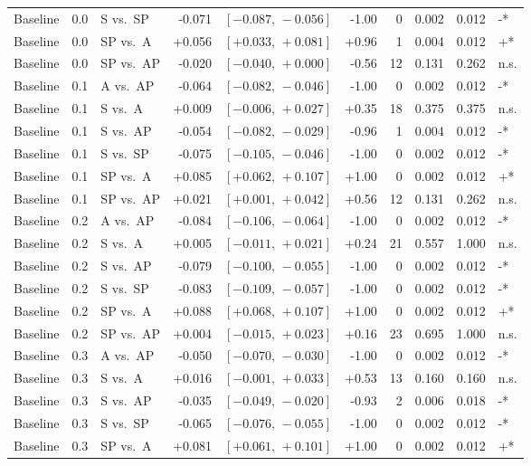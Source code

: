\begin{landscape}
\begin{scriptsize}
\begin{longtable}{lllrrrrrrl}
Baseline & 0.0 & S vs.\ SP & -0.071 & $[-0.087,\,-0.056]$ & -1.00 & 0 & 0.002 & 0.012 & -* \\
Baseline & 0.0 & SP vs.\ A & +0.056 & $[+0.033,\,+0.081]$ & +0.96 & 1 & 0.004 & 0.012 & +* \\
Baseline & 0.0 & SP vs.\ AP & -0.020 & $[-0.040,\,+0.000]$ & -0.56 & 12 & 0.131 & 0.262 & n.s. \\
Baseline & 0.1 & A vs.\ AP & -0.064 & $[-0.082,\,-0.046]$ & -1.00 & 0 & 0.002 & 0.012 & -* \\
Baseline & 0.1 & S vs.\ A & +0.009 & $[-0.006,\,+0.027]$ & +0.35 & 18 & 0.375 & 0.375 & n.s. \\
Baseline & 0.1 & S vs.\ AP & -0.054 & $[-0.082,\,-0.029]$ & -0.96 & 1 & 0.004 & 0.012 & -* \\
Baseline & 0.1 & S vs.\ SP & -0.075 & $[-0.105,\,-0.046]$ & -1.00 & 0 & 0.002 & 0.012 & -* \\
Baseline & 0.1 & SP vs.\ A & +0.085 & $[+0.062,\,+0.107]$ & +1.00 & 0 & 0.002 & 0.012 & +* \\
Baseline & 0.1 & SP vs.\ AP & +0.021 & $[+0.001,\,+0.042]$ & +0.56 & 12 & 0.131 & 0.262 & n.s. \\
Baseline & 0.2 & A vs.\ AP & -0.084 & $[-0.106,\,-0.064]$ & -1.00 & 0 & 0.002 & 0.012 & -* \\
Baseline & 0.2 & S vs.\ A & +0.005 & $[-0.011,\,+0.021]$ & +0.24 & 21 & 0.557 & 1.000 & n.s. \\
Baseline & 0.2 & S vs.\ AP & -0.079 & $[-0.100,\,-0.055]$ & -1.00 & 0 & 0.002 & 0.012 & -* \\
Baseline & 0.2 & S vs.\ SP & -0.083 & $[-0.109,\,-0.057]$ & -1.00 & 0 & 0.002 & 0.012 & -* \\
Baseline & 0.2 & SP vs.\ A & +0.088 & $[+0.068,\,+0.107]$ & +1.00 & 0 & 0.002 & 0.012 & +* \\
Baseline & 0.2 & SP vs.\ AP & +0.004 & $[-0.015,\,+0.023]$ & +0.16 & 23 & 0.695 & 1.000 & n.s. \\
Baseline & 0.3 & A vs.\ AP & -0.050 & $[-0.070,\,-0.030]$ & -1.00 & 0 & 0.002 & 0.012 & -* \\
Baseline & 0.3 & S vs.\ A & +0.016 & $[-0.001,\,+0.033]$ & +0.53 & 13 & 0.160 & 0.160 & n.s. \\
Baseline & 0.3 & S vs.\ AP & -0.035 & $[-0.049,\,-0.020]$ & -0.93 & 2 & 0.006 & 0.018 & -* \\
Baseline & 0.3 & S vs.\ SP & -0.065 & $[-0.076,\,-0.055]$ & -1.00 & 0 & 0.002 & 0.012 & -* \\
Baseline & 0.3 & SP vs.\ A & +0.081 & $[+0.061,\,+0.101]$ & +1.00 & 0 & 0.002 & 0.012 & +* \\

\end{longtable}
\end{scriptsize}
\end{landscape}
